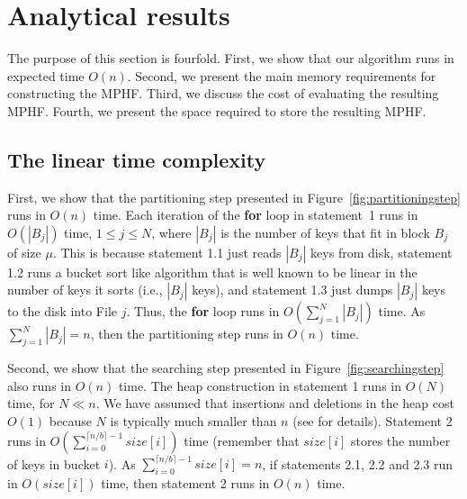 \enlargethispage{2\baselineskip}
\section{Analytical results}
\label{sec:analytcal-results}

\vspace{-1mm}
The purpose of this section is fourfold.
First, we show that our algorithm runs in expected time $O(n)$. 
Second, we present the main memory requirements for constructing the MPHF.
Third, we discuss the cost of evaluating the resulting MPHF.
Fourth, we present the space required to store the resulting MPHF.

\vspace{-2mm}
\subsection{The linear time complexity}
\label{sec:linearcomplexity}
 
First, we show that the partitioning step presented in
Figure~\ref{fig:partitioningstep} runs in $O(n)$ time.
Each iteration of the {\bf for} loop in statement~1
runs in $O(|B_j|)$ time, $1 \leq j \leq N$, where $|B_j|$ is the 
number of keys 
that fit in block $B_j$ of size $\mu$. This is because statement 1.1 just reads
$|B_j|$ keys from disk, statement 1.2 runs a bucket sort like algorithm 
that is well known to be linear in the number of keys it sorts (i.e., $|B_j|$ keys),
and statement 1.3 just dumps $|B_j|$ keys to the disk into File $j$.
Thus, the {\bf for} loop runs in $O(\sum_{j=1}^{N}|B_j|)$ time. 
As $\sum_{j=1}^{N}|B_j|=n$, then the partitioning step runs in $O(n)$ time.

Second, we show that the searching step presented in 
Figure~\ref{fig:searchingstep} also runs in $O(n)$ time.
The heap construction in statement 1 runs in $O(N)$ time, for $N \ll n$.
We have assumed that insertions and deletions in the heap cost $O(1)$ because 
$N$ is typically much smaller than $n$ (see \cite[Section 6.4]{bkz06t} for details).
Statement 2 runs in $O(\sum_{i=0}^{\lceil n/b \rceil - 1} \mathit{size}[i])$ time
(remember that $\mathit{size}[i]$ stores the number of keys in bucket $i$).
As $\sum_{i=0}^{\lceil n/b \rceil - 1} \mathit{size}[i] = n$, if 
statements 2.1, 2.2 and 2.3 run in $O(\mathit{size}[i])$ time, then statement 2
runs in $O(n)$ time.

